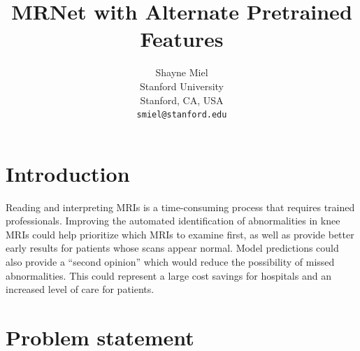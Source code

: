 \documentclass[10pt,twocolumn,letterpaper]{article}
\begin{document}
\title{MRNet with Alternate Pretrained Features}

\author{Shayne Miel\\
Stanford University\\
Stanford, CA, USA\\
{\tt\small smiel@stanford.edu}
}

\maketitle


\section{Introduction}

Reading and interpreting MRIs is a time-consuming process that requires trained
professionals. Improving the automated identification of abnormalities in knee MRIs
could help prioritize which MRIs to examine first, as well as provide better early
results for patients whose scans appear normal. Model predictions could
also provide a ``second opinion'' which would reduce the possibility of missed
abnormalities. This could represent a large cost savings for hospitals and
an increased level of care for patients.

\section{Problem statement}
\end{document}
